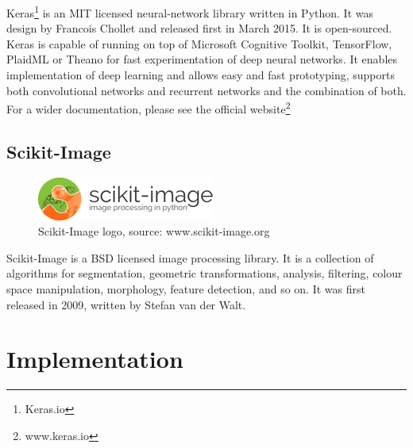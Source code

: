 Keras\footnote{Keras.io} %
is an MIT licensed neural-network library written in Python. It was design by Francois Chollet and released first in March 2015. It is open-sourced. Keras is capable of running on top of Microsoft Cognitive Toolkit, TensorFlow, PlaidML or Theano for fast experimentation of deep neural networks. It enables implementation of deep learning and allows easy and 
fast prototyping, supports both convolutional networks and recurrent networks and the combination of both. For a wider documentation, please see the official website\footnote{www.keras.io}

\subsection{ Scikit-Image}
\begin{figure}[H]
    \centering
    \includegraphics[width=0.7\linewidth]{images/Scikit-image.png}
     \caption{Scikit-Image logo, source: www.scikit-image.org}
  \end{figure}

Scikit-Image is a BSD licensed image processing library. It is a collection of algorithms for segmentation, 
geometric transformations, analysis, filtering, colour space manipulation, morphology, feature detection, and so on. It was first released in 2009, written by Stefan van der Walt.
\cleardoublepage
\section{Implementation}
